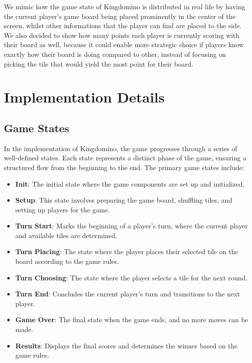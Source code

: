 \documentclass[conference]{IEEEtran}
\begin{document}
We mimic how the game state of Kingdomino is distributed in real life by having
the current player's game board being placed prominently in the center of the
screen, whilst other informations that the player can find are placed to the
side. We also decided to show how many points each player is currently scoring
with their board as well, because it could enable more strategic choice if
players know exactly how their board is doing compared to other, instead of
focusing on picking the tile that would yield the most point for their board.

\section{Implementation Details}
\label{sec:implementation_details}

\subsection{Game States}

In the implementation of Kingdomino, the game progresses through a series of
well-defined states. Each state represents a distinct phase of the game,
ensuring a structured flow from the beginning to the end. The primary game
states include:

\begin{itemize}
    \item \textbf{Init}: The initial state where the game components are set up and initialized.
    \item \textbf{Setup}: This state involves preparing the game board, shuffling tiles, and setting up players for the game.
    \item \textbf{Turn Start}: Marks the beginning of a player's turn, where the current player and available tiles are determined.
    \item \textbf{Turn Placing}: The state where the player places their selected tile on the board according to the game rules.
    \item \textbf{Turn Choosing}: The state where the player selects a tile for the next round.
    \item \textbf{Turn End}: Concludes the current player's turn and transitions to the next player.
    \item \textbf{Game Over}: The final state when the game ends, and no more moves can be made.
    \item \textbf{Results}: Displays the final scores and determines the winner based on the game rules.
\end{itemize}
\end{document}

